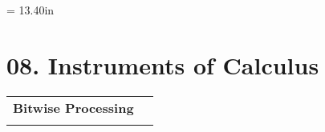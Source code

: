 \documentclass[a4paper,12pt]{article}
\begin{document}
\newpage\thispagestyle{empty}\pdfpageheight = 13.40in\enlargethispage{100in}

\section{08. Instruments of Calculus}

\begin{tabular}{!{\vrule width 1pt}L{3.7cm}!{\vrule width 1pt}L{15.3cm}!{\vrule width 0pt}} 


\textbf{Bitwise Processing} & \\


\end{tabular}

\medskip\smallskip
\end{document}
